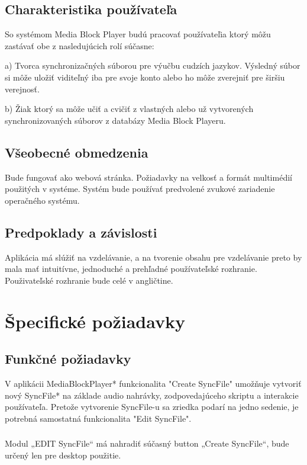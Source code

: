 \documentclass{article}
\begin{document}
\subsection{Charakteristika používateľa }
So systémom Media Block Player budú pracovať používateľia ktorý môžu zastávať obe z nasledujúcich rolí súčasne:

a) Tvorca synchronizačných súborou pre výučbu cudzích jazykov. Výsledný súbor si môže uložiť viditeľný iba pre svoje konto alebo ho môže zverejniť pre širšiu verejnosť.

b) Žiak ktorý sa môže učiť a cvičiť z vlastných alebo už vytvorených synchronizovaných súborov z databázy Media Block Playeru.


\subsection{Všeobecné obmedzenia}
Bude fungovať ako webová stránka. Požiadavky na velkosť a formát multimédií použitých v systéme. Systém bude používať predvolené zvukové zariadenie operačného systému.

\subsection{Predpoklady a závislosti}
Aplikácia má slúžiť na vzdelávanie, a na tvorenie obsahu pre vzdelávanie preto by mala mať intuitívne, jednoduché a prehľadné používateľské rozhranie. Použivateľské rozhranie bude celé v angličtine.



\section{Špecifické požiadavky}

\subsection{Funkčné požiadavky}
V aplikácii MediaBlockPlayer* funkcionalita "Create SyncFile" umožňuje vytvoriť nový SyncFile* na základe audio nahrávky, zodpovedajúceho skriptu a interakcie používateľa. Pretože vytvorenie SyncFile-u sa zriedka podarí na jedno sedenie, je potrebná samostatná funkcionalita "Edit SyncFile". 

\subsubsection{}
Modul „EDIT SyncFile“ má nahradiť súčasný button „Create SyncFile“, bude určený len pre desktop použitie. 
\end{document}
